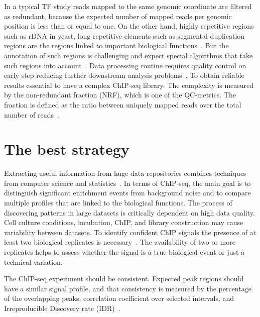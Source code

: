 In a typical TF study reads mapped to the same genomic coordinate are filtered as redundant, because the expected number of mapped reads per genomic position is less than or equal to one. 
On the other hand, highly repetitive regions such as rDNA in yeast, long repetitive elements such as segmental duplication regions are the regions linked to important biological functions~\cite{nakato2017recent}. But the annotation of such regions is challenging and expect special algorithms that take such regions into account~\cite{chung2011discovering}.
Data processing routine requires quality control on early step reducing further downstream analysis problems~\cite{ewels2016multiqc}.
To obtain reliable results essential to have a complex ChIP-seq library.
The complexity is measured by the non-redundant fraction (NRF), which is one of the QC-metrics.
The fraction is defined as the ratio between uniquely mapped reads over the total number of reads~\cite{landt2012chip}.





\section{The best strategy}
\label{strategy}

Extracting useful information from huge data repositories combines techniques from computer science and statistics~\cite{friedman2001elements}. 
In terms of ChIP-seq, the main goal is to distinguish significant enrichment events from background noise and to compare multiple profiles that are linked to the biological functions. 
The process of discovering patterns in large datasets is critically dependent on high data quality. 
Cell culture conditions, incubation, ChIP, and library construction may cause variability between datasets. 
To identify confident ChIP signals the presence of at least two biological replicates is necessary~\cite{kidder2011chip}. 
The availability of two or more replicates helps to assess whether the signal is a true biological event or just a technical variation. 

The ChIP-seq experiment should be consistent. 
Expected peak regions should have a similar signal profile, and that consistency is measured by the percentage of the overlapping peaks, correlation coefficient over selected intervals, and Irreproducible Discovery rate (IDR)~\cite{shin2013computational}.

